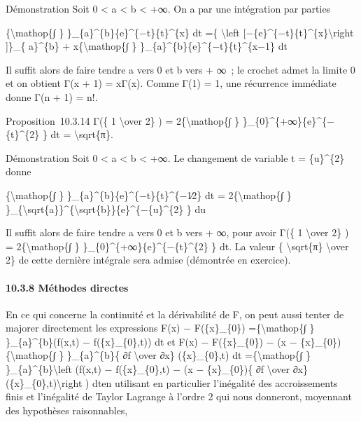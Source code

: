 \documentclass[]{article}
\begin{document}
Démonstration Soit 0 \textless{} a \textless{} b \textless{} +∞. On a
par une intégration par parties

\{\textbackslash{}mathop\{∫ \}
\}\_\{a\}\^{}\{b\}\{e\}\^{}\{−t\}\{t\}\^{}\{x\} dt =\{
\textbackslash{}left
{[}−\{e\}\^{}\{−t\}\{t\}\^{}\{x\}\textbackslash{}right {]}\}\_\{
a\}\^{}\{b\} + x\{\textbackslash{}mathop\{∫ \}
\}\_\{a\}\^{}\{b\}\{e\}\^{}\{−t\}\{t\}\^{}\{x−1\} dt

Il suffit alors de faire tendre a vers 0 et b vers + ∞~; le crochet
admet la limite 0 et on obtient Γ(x + 1) = xΓ(x). Comme Γ(1) = 1, une
récurrence immédiate donne Γ(n + 1) = n!.

Proposition~10.3.14 Γ(\{ 1 \textbackslash{}over 2\} ) =
2\{\textbackslash{}mathop\{∫ \}
\}\_\{0\}\^{}\{+∞\}\{e\}\^{}\{−\{t\}\^{}\{2\} \} dt =
\textbackslash{}sqrt\{π\}.

Démonstration Soit 0 \textless{} a \textless{} b \textless{} +∞. Le
changement de variable t = \{u\}\^{}\{2\} donne

\{\textbackslash{}mathop\{∫ \}
\}\_\{a\}\^{}\{b\}\{e\}\^{}\{−t\}\{t\}\^{}\{−1∕2\} dt =
2\{\textbackslash{}mathop\{∫ \}
\}\_\{\textbackslash{}sqrt\{a\}\}\^{}\{\textbackslash{}sqrt\{b\}\}\{e\}\^{}\{−\{u\}\^{}\{2\}
\} du

Il suffit alors de faire tendre a vers 0 et b vers + ∞, pour avoir Γ(\{
1 \textbackslash{}over 2\} ) = 2\{\textbackslash{}mathop\{∫ \}
\}\_\{0\}\^{}\{+∞\}\{e\}\^{}\{−\{t\}\^{}\{2\} \} dt. La valeur \{
\textbackslash{}sqrt\{π\} \textbackslash{}over 2\} de cette dernière
intégrale sera admise (démontrée en exercice).

\paragraph{10.3.8 Méthodes directes}

En ce qui concerne la continuité et la dérivabilité de F, on peut aussi
tenter de majorer directement les expressions F(x) − F(\{x\}\_\{0\})
=\{\textbackslash{}mathop\{∫ \} \}\_\{a\}\^{}\{b\}(f(x,t) −
f(\{x\}\_\{0\},t)) dt et F(x) − F(\{x\}\_\{0\}) − (x −
\{x\}\_\{0\})\{\textbackslash{}mathop\{∫ \} \}\_\{a\}\^{}\{b\}\{ ∂f
\textbackslash{}over ∂x\} (\{x\}\_\{0\},t) dt
=\{\textbackslash{}mathop\{∫ \} \}\_\{a\}\^{}\{b\}\textbackslash{}left
(f(x,t) − f(\{x\}\_\{0\},t) − (x − \{x\}\_\{0\})\{ ∂f
\textbackslash{}over ∂x\} (\{x\}\_\{0\},t)\textbackslash{}right ) dten
utilisant en particulier l'inégalité des accroissements finis et
l'inégalité de Taylor Lagrange à l'ordre 2 qui nous donneront, moyennant
des hypothèses raisonnables,
\end{document}

